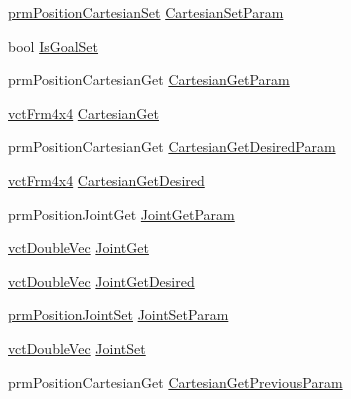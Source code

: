 \begin{DoxyCompactItemize}
\begin{tabbing}
\end{tabbing}\item 
\hyperlink{classprm_position_cartesian_set}{prm\+Position\+Cartesian\+Set} \hyperlink{classmts_intuitive_research_kit_arm_aac57cf7ee853a7eb49c166d2b466355d}{Cartesian\+Set\+Param}
\item 
bool \hyperlink{classmts_intuitive_research_kit_arm_a195a5e42ec222e5315017bc97092079a}{Is\+Goal\+Set}
\item 
prm\+Position\+Cartesian\+Get \hyperlink{classmts_intuitive_research_kit_arm_aaa7f1d15ec9a20f8ed317d8139561dd7}{Cartesian\+Get\+Param}
\item 
\hyperlink{vct_transformation_types_8h_a33da47f4deb2556b37a69a2c44b29d75}{vct\+Frm4x4} \hyperlink{classmts_intuitive_research_kit_arm_a1d55346b0a151a2cb1620f073dbcc574}{Cartesian\+Get}
\item 
prm\+Position\+Cartesian\+Get \hyperlink{classmts_intuitive_research_kit_arm_a6b37fa3ae133f7fd9b281f4f37d55625}{Cartesian\+Get\+Desired\+Param}
\item 
\hyperlink{vct_transformation_types_8h_a33da47f4deb2556b37a69a2c44b29d75}{vct\+Frm4x4} \hyperlink{classmts_intuitive_research_kit_arm_ab05e2c95fcc34a1471801b6fa052c103}{Cartesian\+Get\+Desired}
\item 
prm\+Position\+Joint\+Get \hyperlink{classmts_intuitive_research_kit_arm_ae80cfd241b7a82e0f0f7861096c98a90}{Joint\+Get\+Param}
\item 
\hyperlink{vct_dynamic_vector_types_8h_ade4b3068c86fb88f41af2e5187e491c2}{vct\+Double\+Vec} \hyperlink{classmts_intuitive_research_kit_arm_a6e083406ccebe49d0a6f7991a3f227ca}{Joint\+Get}
\item 
\hyperlink{vct_dynamic_vector_types_8h_ade4b3068c86fb88f41af2e5187e491c2}{vct\+Double\+Vec} \hyperlink{classmts_intuitive_research_kit_arm_a422d2173d1932addd901900c61b1dd11}{Joint\+Get\+Desired}
\item 
\hyperlink{classprm_position_joint_set}{prm\+Position\+Joint\+Set} \hyperlink{classmts_intuitive_research_kit_arm_aa0702f82bb6fd659326d49cec3e37c25}{Joint\+Set\+Param}
\item 
\hyperlink{vct_dynamic_vector_types_8h_ade4b3068c86fb88f41af2e5187e491c2}{vct\+Double\+Vec} \hyperlink{classmts_intuitive_research_kit_arm_a944bbb1f8a925a9c6d2e4cee2ef5ae54}{Joint\+Set}
\item 
prm\+Position\+Cartesian\+Get \hyperlink{classmts_intuitive_research_kit_arm_a76916616528db5cf1a5f564f006699f9}{Cartesian\+Get\+Previous\+Param}
\item 

\end{DoxyCompactItemize}
